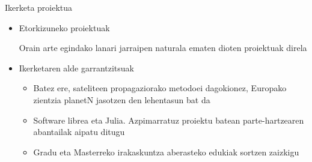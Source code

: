 \documentclass[
 10pt,%
 compress,%
 t,       %
 xcolor=svgnames
]{beamer}
\theoremstyle{definition} \newtheorem{definicion}{Definicion}[section]
\theoremstyle{propiedades} \newtheorem{propiedades}{Propiedades}[section]
\begin{document}
\begin{frame}{Ikerketa proiektua}
{\begin{itemize}
\begin{itemize}
	\medskip
	\item Gehien bat N-gorputzetako probleman zentratu gara (oso aberatsa baita) 
	
	\medskip
	\item Gauss-en metodo inplizituen abantailak erakutsi nahi dugu 
	
	Metodo hauek \textbf{propietate konputazional eta matematiko} interesgarriak dituzte eta inplementazio bide berriak irekitzen dizkigu
	
	
\end{itemize}


\medskip

\item Etorkizuneko proiektuak

\medskip

Orain arte egindako lanari jarraipen naturala ematen dioten proiektuak direla

\medskip
\item Ikerketaren alde garrantzitsuak

\begin{itemize}
	\item Batez ere, sateliteen propagaziorako metodoei dagokionez, Europako zientzia planetN jasotzen den lehentasun bat da
	
	\medskip
	\item Software librea eta Julia. Azpimarratuz proiektu batean parte-hartzearen abantailak aipatu ditugu
	
	
	\medskip
	\item Gradu eta Masterreko irakaskuntza aberasteko edukiak sortzen zaizkigu
	
\end{itemize}

\end{itemize}


}



\end{frame}




\end{document}
